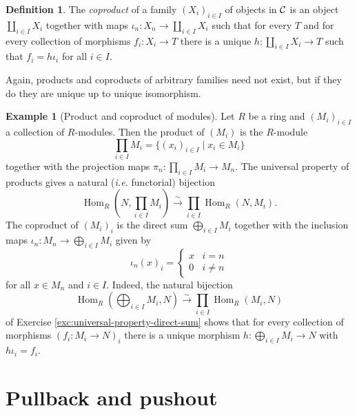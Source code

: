 \documentclass[11pt]{amsbook}
\newcommand{\longisomto}{\overset{\sim}{\longrightarrow}}
\DeclareMathOperator\Hom{Hom}
\theoremstyle{plain}
\theoremstyle{definition}
\newtheorem{definition}[theorem]{Definition}
\newtheorem{example}[theorem]{Example}
\begin{document}
\begin{definition}
The \emph{coproduct} of a family $(X_i)_{i\in I}$  of objects in ${\mathcal{C}}$ is an object $\coprod_{i\in I} X_i$ together with maps $\iota_n \colon X_n\to \coprod_{i\in I} X_i$ such that for every $T$ and for every collection of morphisms $f_i \colon X_i\to T$ there is a unique $h\colon \coprod_{i\in I} X_i \to T$ such that $f_i = h\iota_i$ for all $i\in I$.
\end{definition}

Again, products and coproducts of arbitrary families need not exist, but if they do they are unique up to unique isomorphism.

\begin{example}[Product and coproduct of modules]
Let $R$ be a ring and $(M_i)_{i\in I}$ a collection of $R$-modules. Then the product of $(M_i)$ is the $R$-module
\[
	\prod_{i\in I} M_i = \{ (x_i)_{i\in I} \mid x_i \in M_i \}
\]
together with the projection maps $\pi_n\colon \prod_{i\in I} M_i \to M_n$. 
The universal property of products gives a natural (\emph{i.e.} functorial) bijection
\[
	\Hom_R( N,  \prod_{i\in I} M_i ) \longisomto \prod_{i\in I} \Hom_R(N, M_i ).
\]
The coproduct of $(M_i)_i$ is the direct sum $\bigoplus_{i\in I} M_i$ 
together with the inclusion maps $\iota_n\colon M_n \to \bigoplus_{i\in I} M_i $ given by
\[
	\iota_n(x)_i = \begin{cases} x & i=n \\ 0 & i \neq n \end{cases}
\]
for all $x\in M_n$ and $i\in I$. Indeed, the natural  bijection
\[
	\Hom_R( \bigoplus_{i\in I} M_i, N ) \longisomto \prod_{i\in I} \Hom_R(M_i, N )
\]
of Exercise \ref{exc:universal-property-direct-sum} shows that for every collection of morphisms $(f_i\colon M_i 
\to N)_i$ there is a unique morphism $h\colon  \bigoplus_{i\in I} M_i \to N$ with $h \iota_i = f_i$.
\end{example}



\section{Pullback and pushout}
\end{document}
